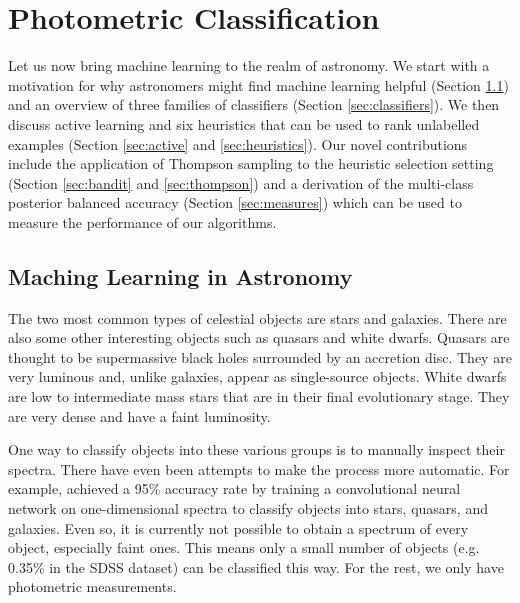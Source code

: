 

\chapter{Photometric Classification}
\label{cha:ml}

Let us now bring machine learning to the realm of astronomy. We start with a motivation for why
astronomers might find machine learning helpful (Section \ref{sec:machine}) and an overview of
three families of classifiers (Section \ref{sec:classifiers}). We then discuss active learning and
six heuristics that can be used to rank unlabelled examples (Section \ref{sec:active} and
\ref{sec:heuristics}). Our novel contributions include the application of Thompson sampling to the
heuristic selection setting  (Section \ref{sec:bandit} and \ref{sec:thompson}) and a derivation of
the multi-class posterior balanced accuracy (Section \ref{sec:measures}) which can be used to
measure the performance of our algorithms.


\section{Maching Learning in Astronomy}
\label{sec:machine}

The two most common types of celestial objects are stars and galaxies. There are also some other
interesting objects such as quasars and white dwarfs. Quasars are thought to be supermassive black
holes surrounded by an accretion disc. They are very luminous and, unlike galaxies, appear as
single-source objects. White dwarfs are low to intermediate mass stars that are in their
final evolutionary stage. They are very dense and have a faint luminosity.

One way to classify objects into these various groups is to manually inspect their spectra. There
have even been attempts to make the process more automatic. For example,  achieved a
95\% accuracy rate by training a convolutional neural network on one-dimensional spectra to classify
objects into stars, quasars, and galaxies. Even so, it is currently not possible to obtain a
spectrum of every object, especially faint ones. This means only a small number of objects (e.g.
0.35\% in the SDSS dataset) can be classified this way. For the rest, we only have
photometric measurements.

